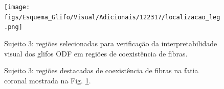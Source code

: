 \begin{figure}[H]
     \centering
     \texttt{[image: figs/Esquema\_Glifo/Visual/Adicionais/122317/localizacao\_leg.png]}
      \caption{Sujeito 3: regiões selecionadas para verificação da interpretabilidade visual dos glifos ODF em regiões de coexistência de fibras.}
       \label{fig::122317_localizacao}
 \end{figure}

\begin{figure}[H]
 \centering
    \caption{Sujeito 3: regiões destacadas de coexistência de fibras na fatia coronal mostrada na Fig. \ref{fig::122317_localizacao}.
    }
    \label{fig::122317}
\end{figure}

